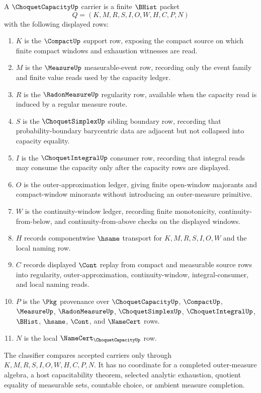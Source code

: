 \begin{definition}
\label{def:choquet-capacity-carrier}
A $\ChoquetCapacityUp$ carrier is a finite $\BHist$ packet
$$
Q=(K,M,R,S,I,O,W,H,C,P,N)
$$
with the following displayed rows:
\begin{enumerate}
\item $K$ is the $\CompactUp$ support row, exposing the compact source on which finite compact windows and exhaustion witnesses are read.
\item $M$ is the $\MeasureUp$ measurable-event row, recording only the event family and finite value reads used by the capacity ledger.
\item $R$ is the $\RadonMeasureUp$ regularity row, available when the capacity read is induced by a regular measure route.
\item $S$ is the $\ChoquetSimplexUp$ sibling boundary row, recording that probability-boundary barycentric data are adjacent but not collapsed into capacity equality.
\item $I$ is the $\ChoquetIntegralUp$ consumer row, recording that integral reads may consume the capacity only after the capacity rows are displayed.
\item $O$ is the outer-approximation ledger, giving finite open-window majorants and compact-window minorants without introducing an outer-measure primitive.
\item $W$ is the continuity-window ledger, recording finite monotonicity, continuity-from-below, and continuity-from-above checks on the displayed windows.
\item $H$ records componentwise $\hsame$ transport for $K,M,R,S,I,O,W$ and the local naming row.
\item $C$ records displayed $\Cont$ replay from compact and measurable source rows into regularity, outer-approximation, continuity-window, integral-consumer, and local naming reads.
\item $P$ is the $\Pkg$ provenance over $\ChoquetCapacityUp$, $\CompactUp$, $\MeasureUp$, $\RadonMeasureUp$, $\ChoquetSimplexUp$, $\ChoquetIntegralUp$, $\BHist$, $\hsame$, $\Cont$, and $\NameCert$ rows.
\item $N$ is the local $\NameCert_{\ChoquetCapacityUp}$ row.
\end{enumerate}
The classifier compares accepted carriers only through $K,M,R,S,I,O,W,H,C,P,N$. It has no coordinate for a completed outer-measure algebra, a host capacitability theorem, selected analytic exhaustion, quotient equality of measurable sets, countable choice, or ambient measure completion.
\end{definition}

